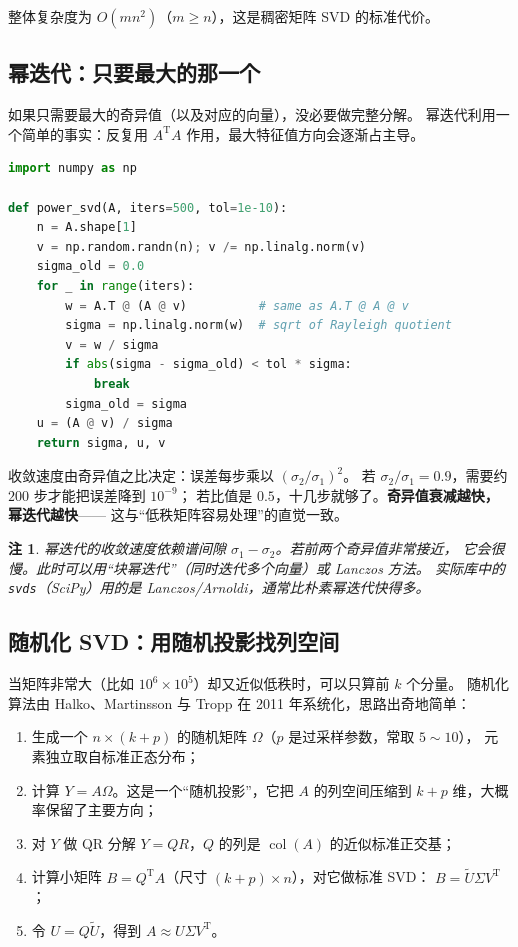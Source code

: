 \documentclass[UTF8, 11pt, a4paper, fontset=windows]{ctexart}
\theoremstyle{cnthm}
\theoremstyle{cndef}
\newtheorem{rem}[defn]{注}
\newcommand{\T}{^{\mathrm{T}}}
\DeclareMathOperator{\Col}{col}
\begin{document}
整体复杂度为 $O(mn^2)$（$m\ge n$），这是稠密矩阵 SVD 的标准代价。

\subsection{幂迭代：只要最大的那一个}

如果只需要最大的奇异值（以及对应的向量），没必要做完整分解。
幂迭代利用一个简单的事实：反复用 $A\T A$ 作用，最大特征值方向会逐渐占主导。

\begin{lstlisting}[language=Python]
import numpy as np

def power_svd(A, iters=500, tol=1e-10):
    n = A.shape[1]
    v = np.random.randn(n); v /= np.linalg.norm(v)
    sigma_old = 0.0
    for _ in range(iters):
        w = A.T @ (A @ v)          # same as A.T @ A @ v
        sigma = np.linalg.norm(w)  # sqrt of Rayleigh quotient
        v = w / sigma
        if abs(sigma - sigma_old) < tol * sigma:
            break
        sigma_old = sigma
    u = (A @ v) / sigma
    return sigma, u, v
\end{lstlisting}

收敛速度由奇异值之比决定：误差每步乘以 $(\sigma_2/\sigma_1)^2$。
若 $\sigma_2/\sigma_1=0.9$，需要约 $200$ 步才能把误差降到 $10^{-9}$；
若比值是 $0.5$，十几步就够了。\textbf{奇异值衰减越快，幂迭代越快}——
这与“低秩矩阵容易处理”的直觉一致。

\begin{rem}
幂迭代的收敛速度依赖谱间隙 $\sigma_1-\sigma_2$。若前两个奇异值非常接近，
它会很慢。此时可以用“块幂迭代”（同时迭代多个向量）或 Lanczos 方法。
实际库中的 \texttt{svds}（SciPy）用的是 Lanczos/Arnoldi，通常比朴素幂迭代快得多。
\end{rem}

\subsection{随机化 SVD：用随机投影找列空间}

当矩阵非常大（比如 $10^6\times10^5$）却又近似低秩时，可以只算前 $k$ 个分量。
随机化算法由 Halko、Martinsson 与 Tropp 在 2011 年系统化，思路出奇地简单：

\begin{enumerate}
  \item 生成一个 $n\times(k+p)$ 的随机矩阵 $\Omega$（$p$ 是过采样参数，常取 $5\sim10$），
        元素独立取自标准正态分布；
  \item 计算 $Y=A\Omega$。这是一个“随机投影”，它把 $A$ 的列空间压缩到
        $k+p$ 维，大概率保留了主要方向；
  \item 对 $Y$ 做 QR 分解 $Y=QR$，$Q$ 的列是 $\Col(A)$ 的近似标准正交基；
  \item 计算小矩阵 $B=Q\T A$（尺寸 $(k+p)\times n$），对它做标准 SVD：
        $B=\tilde{U}\Sigma V\T$；
  \item 令 $U=Q\tilde{U}$，得到 $A\approx U\Sigma V\T$。
\end{enumerate}
\end{document}

